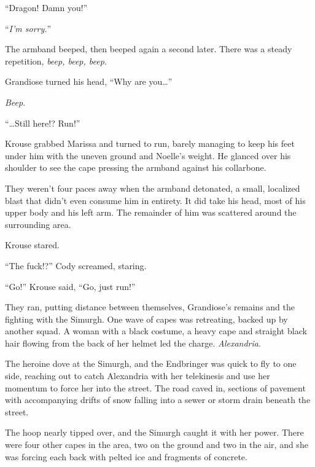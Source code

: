 ``Dragon!  Damn you!''



``\emph{I'm sorry.}''



The armband beeped, then beeped again a second later.  There was a steady repetition, \emph{beep, beep, beep}.



Grandiose turned his head, ``Why are you\ldots''



\emph{Beep}.



``\ldots{}Still here!?  Run!''



Krouse grabbed Marissa and turned to run, barely managing to keep his feet under him with the uneven ground and Noelle's weight.  He glanced over his shoulder to see the cape pressing the armband against his collarbone.



They weren't four paces away when the armband detonated, a small, localized blast that didn't even consume him in entirety.  It did take his head, most of his upper body and his left arm.  The remainder of him was scattered around the surrounding area.



Krouse stared.



``The fuck!?'' Cody screamed, staring.



``Go!'' Krouse said, ``Go, just run!''



They ran, putting distance between themselves, Grandiose's remains and the fighting with the Simurgh.  One wave of capes was retreating, backed up by another squad.  A woman with a black costume, a heavy cape and straight black hair flowing from the back of her helmet led the charge.  \emph{Alexandria}.



The heroine dove at the Simurgh, and the Endbringer was quick to fly to one side, reaching out to catch Alexandria with her telekinesis and use her momentum to force her into the street.  The road caved in, sections of pavement with accompanying drifts of snow falling into a sewer or storm drain beneath the street.



The hoop nearly tipped over, and the Simurgh caught it with her power.  There were four other capes in the area, two on the ground and two in the air, and she was forcing each back with pelted ice and fragments of concrete.



